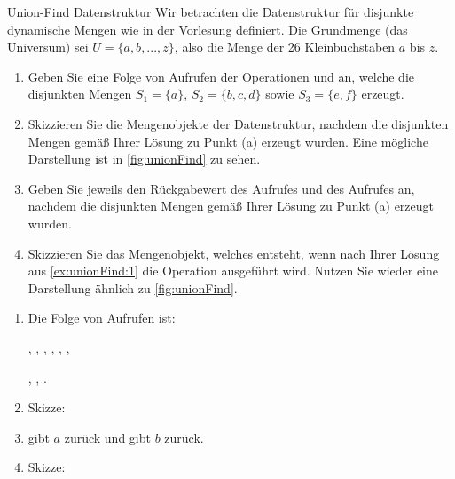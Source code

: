 \documentclass{article}
\begin{document}
\begin{exercise}{Union-Find Datenstruktur}
  Wir betrachten die Datenstruktur für disjunkte dynamische Mengen wie in der Vorlesung definiert. Die Grundmenge (das Universum) sei $U = \{a, b, . . . , z\}$, also die Menge der 26 Kleinbuchstaben $a$ bis $z$.
  \begin{enumerate}
    \item\label{ex:unionFind:1} Geben Sie eine Folge von Aufrufen der Operationen  und  an, welche die disjunkten Mengen $S_1 = \{a\}$, $S_2 = \{b, c, d\}$ sowie $S_3 = \{e, f\}$ erzeugt.
    \item Skizzieren Sie die Mengenobjekte der Datenstruktur, nachdem die disjunkten Mengen gemäß Ihrer Lösung zu Punkt (a) erzeugt wurden. Eine mögliche Darstellung ist in \ref{fig:unionFind} zu sehen.
    \item Geben Sie jeweils den Rückgabewert des Aufrufes  und des Aufrufes  an, nachdem die disjunkten Mengen gemäß Ihrer Lösung zu Punkt (a) erzeugt wurden.
    \item Skizzieren Sie das Mengenobjekt, welches entsteht, wenn nach Ihrer Lösung aus \ref{ex:unionFind:1} die Operation  ausgeführt wird. Nutzen Sie wieder eine Darstellung ähnlich zu \ref{fig:unionFind}.
  \end{enumerate}
  

  \begin{solution}
    \begin{enumerate}
      \item Die Folge von Aufrufen ist:\par
            , , , , , ,\par
            , , .
      \item Skizze: 
      \item {} gibt $a$ zurück und  gibt $b$ zurück.
      \item Skizze: 
    \end{enumerate}
  \end{solution}
\end{exercise}
\end{document}
